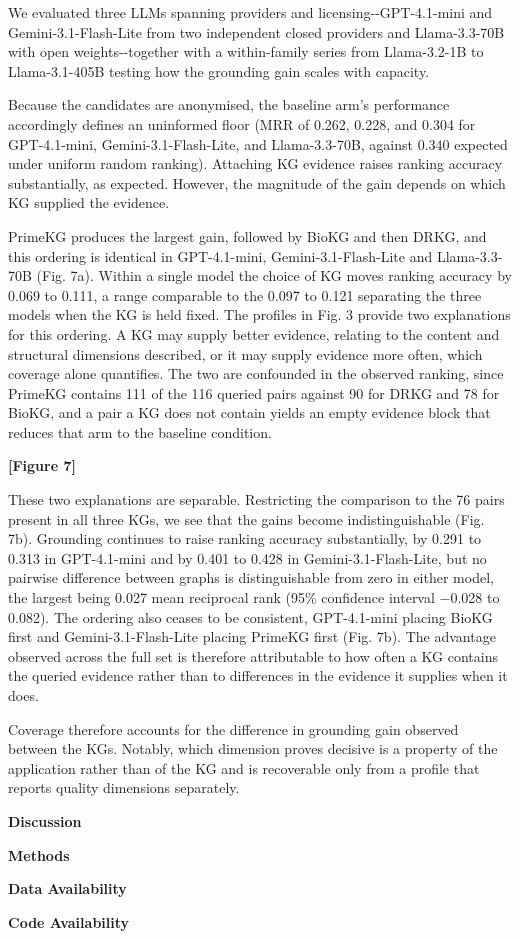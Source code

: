 We evaluated three LLMs spanning providers and licensing-\/-GPT-4.1-mini and Gemini-3.1-Flash-Lite from two independent closed providers and Llama-3.3-70B with open weights-\/-together with a within-family series from Llama-3.2-1B to Llama-3.1-405B testing how the grounding gain scales with capacity.

Because the candidates are anonymised, the baseline arm's performance accordingly defines an uninformed floor (MRR of 0.262, 0.228, and 0.304 for GPT-4.1-mini, Gemini-3.1-Flash-Lite, and Llama-3.3-70B, against 0.340 expected under uniform random ranking). Attaching KG evidence raises ranking accuracy substantially, as expected. However, the magnitude of the gain depends on which KG supplied the evidence.

PrimeKG produces the largest gain, followed by BioKG and then DRKG, and this ordering is identical in GPT-4.1-mini, Gemini-3.1-Flash-Lite and Llama-3.3-70B (Fig. 7a). Within a single model the choice of KG moves ranking accuracy by 0.069 to 0.111, a range comparable to the 0.097 to 0.121 separating the three models when the KG is held fixed. The profiles in Fig. 3 provide two explanations for this ordering. A KG may supply better evidence, relating to the content and structural dimensions described, or it may supply evidence more often, which coverage alone quantifies. The two are confounded in the observed ranking, since PrimeKG contains 111 of the 116 queried pairs against 90 for DRKG and 78 for BioKG, and a pair a KG does not contain yields an empty evidence block that reduces that arm to the baseline condition.

\textbf{{[}Figure 7{]}}

These two explanations are separable. Restricting the comparison to the 76 pairs present in all three KGs, we see that the gains become indistinguishable (Fig. 7b). Grounding continues to raise ranking accuracy substantially, by 0.291 to 0.313 in GPT-4.1-mini and by 0.401 to 0.428 in Gemini-3.1-Flash-Lite, but no pairwise difference between graphs is distinguishable from zero in either model, the largest being 0.027 mean reciprocal rank (95\% confidence interval −0.028 to 0.082). The ordering also ceases to be consistent, GPT-4.1-mini placing BioKG first and Gemini-3.1-Flash-Lite placing PrimeKG first (Fig. 7b). The advantage observed across the full set is therefore attributable to how often a KG contains the queried evidence rather than to differences in the evidence it supplies when it does.

Coverage therefore accounts for the difference in grounding gain observed between the KGs. Notably, which dimension proves decisive is a property of the application rather than of the KG and is recoverable only from a profile that reports quality dimensions separately.

\textbf{Discussion}

\textbf{Methods}

\textbf{Data Availability}

\textbf{Code Availability}

